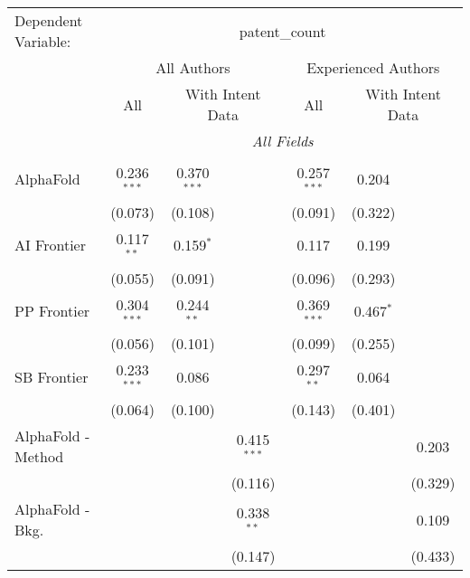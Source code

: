 \begingroup
\centering
\begin{tabular}{lcccccc}
   \tabularnewline \midrule \midrule
   Dependent Variable: & \multicolumn{6}{c}{patent\_count}\\
 & \multicolumn{3}{c}{All Authors} & \multicolumn{3}{c}{Experienced Authors} \\
\cmidrule(lr){2-4} \cmidrule(lr){5-7}
 & \multicolumn{1}{c}{All} & \multicolumn{2}{c}{With Intent Data} & \multicolumn{1}{c}{All} & \multicolumn{2}{c}{With Intent Data} \\
\cmidrule(lr){2-2} \cmidrule(lr){3-4} \cmidrule(lr){5-5} \cmidrule(lr){6-7}
 & \multicolumn{6}{c}{\textit{All Fields}} \\ \\
   AlphaFold            & 0.236$^{***}$ & 0.370$^{***}$ &               & 0.257$^{***}$ & 0.204       &   \\   
                        & (0.073)       & (0.108)       &               & (0.091)       & (0.322)     &   \\   
   AI Frontier          & 0.117$^{**}$  & 0.159$^{*}$   &               & 0.117         & 0.199       &   \\   
                        & (0.055)       & (0.091)       &               & (0.096)       & (0.293)     &   \\   
   PP Frontier          & 0.304$^{***}$ & 0.244$^{**}$  &               & 0.369$^{***}$ & 0.467$^{*}$ &   \\   
                        & (0.056)       & (0.101)       &               & (0.099)       & (0.255)     &   \\   
   SB Frontier          & 0.233$^{***}$ & 0.086         &               & 0.297$^{**}$  & 0.064       &   \\   
                        & (0.064)       & (0.100)       &               & (0.143)       & (0.401)     &   \\   
   AlphaFold - Method   &               &               & 0.415$^{***}$ &               &             & 0.203\\   
                        &               &               & (0.116)       &               &             & (0.329)\\   
   AlphaFold - Bkg.     &               &               & 0.338$^{**}$  &               &             & 0.109\\   
                        &               &               & (0.147)       &               &             & (0.433)\\   

\end{tabular}
